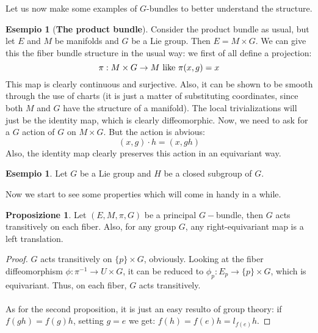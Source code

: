 \documentclass[12pt,a4paper]{report}
\theoremstyle{definition}
\theoremstyle{Theorem}
\newtheorem{Prop}[Def]{Proposizione}
\theoremstyle{definition}
\newtheorem{Ex}[Def]{Esempio}
\theoremstyle{definition}
\theoremstyle{definition}
\begin{document}
		 Let us now make some examples of $G$-bundles to better understand the structure.
		 \begin{Ex}[\textbf{The product bundle}]
		 	Consider the product bundle as usual, but let $E$ and $M$ be manifolds and $G$ be a Lie group. Then $E=M\times G$. We can give this the fiber bundle structure in the usual way: we first of all define a projection:
		 	$$\pi:M\times G\rightarrow M\hbox{ like }\pi(x,g)=x$$
		 	This map is clearly continuous and surjective. Also, it can be shown to be smooth through the use of charts (it is just a matter of substituting coordinates, since both $M$ and $G$ have the structure of a manifold). The local trivializations will just be the identity map, which is clearly diffeomorphic. Now, we need to ask for a $G$ action of $G$ on $M\times G$. But the action is abvious:
		 	$$(x,g)\cdot h=(x,gh)$$
		 	Also, the identity map clearly preserves this action in an equivariant way.
		 \end{Ex}
		 \begin{Ex}
		 	Let $G$ be a Lie group and $H$ be a closed subgroup of $G$.
		 \end{Ex}
	Now we start to see some properties which will come in handy in a while.
	\begin{Prop}
		Let $(E,M,\pi,G)$ be a principal $G-$bundle, then $G$ acts transitively on each fiber. Also, for any group $G$, any right-equivariant map is a left translation.
	\end{Prop}
	\begin{proof}
		$G$ acts transitively on $\{p\} \times G$, obviously. Looking at the fiber diffeomorphism $\phi:\pi^{-1}\rightarrow U\times G$, it can be reduced to $\phi_p:E_p\rightarrow \{p\}\times G$, which is equivariant. Thus, on each fiber, $G$ acts transitively.\\
		\\
		As for the second proposition, it is just an easy resulto of group theory: if $f(gh)=f(g)h$, setting $g=e$ we get: $f(h)=f(e)h=l_{f(e)}h$.
	\end{proof}
\end{document}
